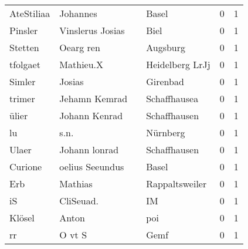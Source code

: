 \documentclass[10pt,a4paper,landscape]{article}
\begin{document}
\begin{longtable}{llllrr}
               AteStiliaa &                           Johannes &             &                                       Basel &          0 &         1 \\
                  Pinsler &                   Vinslerus Josias &             &                                        Biel &          0 &         1 \\
                  Stetten &                          Oearg ren &             &                                    Augsburg &          0 &         1 \\
                 tfolgaet &                          Mathieu.X &             &                             Heidelberg LrJj &          0 &         1 \\
                   Simler &                             Josias &             &                                    Girenbad &          0 &         1 \\
                   trimer &                      Jehamn Kemrad &             &                                Schaffhausea &          0 &         1 \\
                    ülier &                      Johann Kenrad &             &                                Schaffhausen &          0 &         1 \\
                       lu &                               s.n. &             &                                    Nürnberg &          0 &         1 \\
                    Ulaer &                      Johann lonrad &             &                                Schaffhausen &          0 &         1 \\
                  Curione &                    oelius Seeundus &             &                                       Basel &          0 &         1 \\
                      Erb &                            Mathias &             &                              Rappaltsweiler &          0 &         1 \\
                       iS &                          CliSeuad. &             &                                          IM &          0 &         1 \\
                   Klösel &                              Anton &             &                                         poi &          0 &         1 \\
                       rr &                             O vt S &             &                                        Gemf &          0 &         1 \\

\end{longtable}
\end{document}
